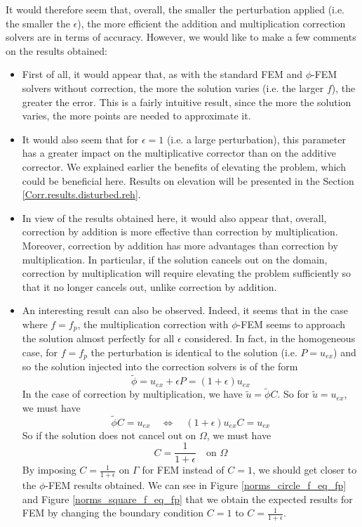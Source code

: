 It would therefore seem that, overall, the smaller the perturbation applied (i.e. the smaller the $\epsilon$), the more efficient the addition and multiplication correction solvers are in terms of accuracy. However, we would like to make a few comments on the results obtained:
\begin{itemize}
	\item First of all, it would appear that, as with the standard FEM and $\phi$-FEM solvers without correction, the more the solution varies (i.e. the larger $f$), the greater the error. This is a fairly intuitive result, since the more the solution varies, the more points are needed to approximate it.
	\item It would also seem that for $\epsilon=1$ (i.e. a large perturbation), this parameter has a greater impact on the multiplicative corrector than on the additive corrector. We explained earlier the benefits of elevating the problem, which could be beneficial here. Results on elevation will be presented in the Section \ref{Corr.results.disturbed.reh}.
	\item In view of the results obtained here, it would also appear that, overall, correction by addition is more effective than correction by multiplication. Moreover, correction by addition has more advantages than correction by multiplication. In particular, if the solution cancels out on the domain, correction by multiplication will require elevating the problem sufficiently so that it no longer cancels out, unlike correction by addition.
	\item An interesting result can also be observed. Indeed, it seems that in the case where $f=f_p$, the multiplication correction with $\phi$-FEM seems to approach the solution almost perfectly for all $\epsilon$ considered.
	In fact, in the homogeneous case, for $f=f_p$ the perturbation is identical to the solution (i.e. $P=u_{ex}$) and so the solution injected into the correction solvers is of the form
	\begin{equation*}
		\tilde{\phi}=u_{ex}+\epsilon P=(1+\epsilon)u_{ex}
	\end{equation*}
	In the case of correction by multiplication, we have $\tilde{u}=\tilde{\phi}C$. So for $\tilde{u}=u_{ex}$, we must have
	\begin{equation*}
		\tilde{\phi}C=u_{ex} \quad \iff \quad (1+\epsilon)u_{ex}C=u_{ex}
	\end{equation*}
	So if the solution does not cancel out on $\Omega$, we must have
	\begin{equation*}
		C=\frac{1}{1+\epsilon} \quad \text{on } \Omega
	\end{equation*}
	By imposing $C=\frac{1}{1+\epsilon}$ on $\Gamma$ for FEM instead of $C=1$, we should get closer to the $\phi$-FEM results obtained. We can see in Figure \ref{norms_circle_f_eq_fp} and Figure \ref{norms_square_f_eq_fp} that we obtain the expected results for FEM by changing the boundary condition $C=1$ to $C=\frac{1}{1+\epsilon}$.
	

\end{itemize}
